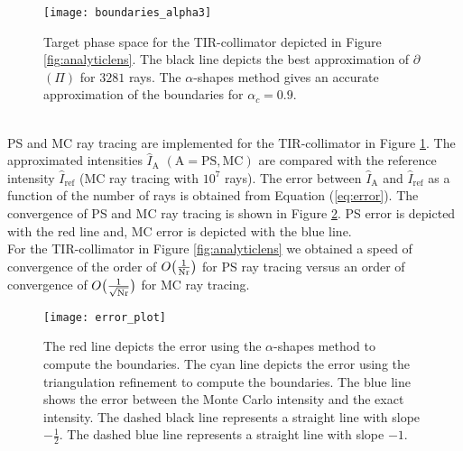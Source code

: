  \begin{figure}[h]
  \begin{center}
       \texttt{[image: boundaries\_alpha3]}
   \end{center}
        \caption{Target phase space for the TIR-collimator depicted in
        Figure \ref{fig:analyticlens}. The black line depicts the best approximation of $\partial$$(\Pi)$ for $3281$ rays. 
The $\alpha$-shapes method gives an accurate approximation of the boundaries for $\alpha_c = 0.9$.}
  \label{fig:Tir2}
\end{figure}
\\ \indent PS and MC ray tracing are implemented for the TIR-collimator in Figure \ref{fig:Tir2}. The approximated intensities $\hat{I}_{\textrm{A}}$ $(\textrm{A} = \textrm{PS}, \textrm{MC})$ are compared with the reference intensity $\hat{I}_{\textrm{ref}}$ (MC ray tracing with $10^7$ rays). The error between $\hat{I}_{\textrm{A}}$ and $\hat{I}_{\textrm{ref}}$ as a function of the number of rays is obtained from Equation (\ref{eq:error}). The convergence of PS and MC ray tracing is shown in Figure \ref{fig:error2}. 
PS error is depicted with the red line and, MC error is depicted with the blue line.\\ \indent
For the TIR-collimator in Figure \ref{fig:analyticlens} we obtained a speed of convergence of the order of $O\big(\frac{1}{\textrm{Nr}}\big)$ for PS ray tracing versus an order of convergence of $O\big(\frac{1}{\sqrt{\textrm{Nr}}}\big)$ for MC ray tracing.
\begin{figure}[h!]
 \begin{center}
   \texttt{[image: error\_plot]}
    \end{center}
     \caption{The red line depicts the error using the $\alpha$-shapes method to compute the boundaries. The cyan line depicts the error using the triangulation refinement to compute the boundaries.
     The blue line shows the error between the Monte Carlo intensity and the exact intensity.
     The dashed black line represents a straight line with slope $-\frac{1}{2}$.
   The dashed blue line represents a straight line with slope $-1$.}
 \label{fig:error2}
\end{figure}
